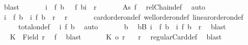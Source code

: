 \begin{isabellebody}
\ blast\isanewline
\ \ \ \ \ \isamarkupfalse%
\ {\isachardoublequoteopen}i\ {\isasymnoteq}\ f\ b\ {\isasymand}\ {\isasymnot}\ {\isacharparenleft}{\kern0pt}f\ b{\isacharcomma}{\kern0pt}i{\isacharparenright}{\kern0pt}\ {\isasymin}\ r{\isachardoublequoteclose}\isanewline
\ \ \ \ \ \isamarkupfalse%
\ As\ f\ \isamarkupfalse%
\ relChain{\isacharunderscore}{\kern0pt}def\ \isamarkupfalse%
\ auto\isanewline
\ \ \ \ \ \isamarkupfalse%
\ {\isachardoublequoteopen}i\ {\isasymnoteq}\ f\ b\ {\isasymand}\ {\isacharparenleft}{\kern0pt}i{\isacharcomma}{\kern0pt}\ f\ b{\isacharparenright}{\kern0pt}\ {\isasymin}\ r{\isachardoublequoteclose}\ \isamarkupfalse%
\ r\isanewline
\ \ \ \ \ \isamarkupfalse%
\ card{\isacharunderscore}{\kern0pt}order{\isacharunderscore}{\kern0pt}on{\isacharunderscore}{\kern0pt}def\ well{\isacharunderscore}{\kern0pt}order{\isacharunderscore}{\kern0pt}on{\isacharunderscore}{\kern0pt}def\ linear{\isacharunderscore}{\kern0pt}order{\isacharunderscore}{\kern0pt}on{\isacharunderscore}{\kern0pt}def\isanewline
\ \ \ \ \ total{\isacharunderscore}{\kern0pt}on{\isacharunderscore}{\kern0pt}def\ \isamarkupfalse%
\ i\ f\ b\ \isamarkupfalse%
\ auto\isanewline
\ \ \ \ \ \isamarkupfalse%
\ b\ \isamarkupfalse%
\ {\isachardoublequoteopen}{\isasymexists}b{\isasymin}B{\isachardot}{\kern0pt}\ i\ {\isasymnoteq}\ f\ b\ {\isasymand}\ {\isacharparenleft}{\kern0pt}i{\isacharcomma}{\kern0pt}\ f\ b{\isacharparenright}{\kern0pt}\ {\isasymin}\ r{\isachardoublequoteclose}\ \isamarkupfalse%
\ blast\isanewline
\ \ \ \isamarkupfalse%
\isanewline
\ \ \ \isamarkupfalse%
\ \isamarkupfalse%
\ {\isachardoublequoteopen}{\isacharquery}{\kern0pt}K\ {\isasymle}\ Field\ r{\isachardoublequoteclose}\ \isamarkupfalse%
\ f\ \isamarkupfalse%
\ blast\isanewline
\ \ \ \isamarkupfalse%
\ \isamarkupfalse%
\ {\isachardoublequoteopen}{\isacharbar}{\kern0pt}{\isacharquery}{\kern0pt}K{\isacharbar}{\kern0pt}\ {\isacharequal}{\kern0pt}o\ r{\isachardoublequoteclose}\ \isamarkupfalse%
\ {}\ r\ \isamarkupfalse%
\ regularCard{\isacharunderscore}{\kern0pt}def\ \isamarkupfalse%
\ blast\isanewline
\ \ \ \isamarkupfalse%
\isanewline
\ \ \ \isacommand{{\isacharbraceleft}{\kern0pt}}\isamarkupfalse%
\isanewline

\end{isabellebody}
